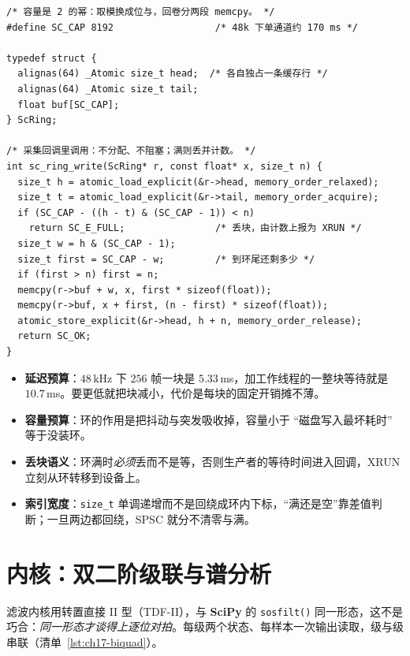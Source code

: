 \documentclass[12pt,a4paper,fontset=fandol]{ctexbook}
\newcommand{\Fn}[1]{\texttt{#1()}}
\newcommand{\Tp}[1]{\texttt{#1}}
\newcommand{\Lib}[1]{\textbf{#1}}
\begin{document}
\begin{lstlisting}[style=cstyle,caption={SPSC 环形缓冲：生产者只写 head，消费者只写 tail},label={lst:ch17-ring}]
/* 容量是 2 的幂：取模换成位与，回卷分两段 memcpy。 */
#define SC_CAP 8192                  /* 48k 下单通道约 170 ms */

typedef struct {
  alignas(64) _Atomic size_t head;  /* 各自独占一条缓存行 */
  alignas(64) _Atomic size_t tail;
  float buf[SC_CAP];
} ScRing;

/* 采集回调里调用：不分配、不阻塞；满则丢并计数。 */
int sc_ring_write(ScRing* r, const float* x, size_t n) {
  size_t h = atomic_load_explicit(&r->head, memory_order_relaxed);
  size_t t = atomic_load_explicit(&r->tail, memory_order_acquire);
  if (SC_CAP - ((h - t) & (SC_CAP - 1)) < n)
    return SC_E_FULL;                /* 丢块，由计数上报为 XRUN */
  size_t w = h & (SC_CAP - 1);
  size_t first = SC_CAP - w;         /* 到环尾还剩多少 */
  if (first > n) first = n;
  memcpy(r->buf + w, x, first * sizeof(float));
  memcpy(r->buf, x + first, (n - first) * sizeof(float));
  atomic_store_explicit(&r->head, h + n, memory_order_release);
  return SC_OK;
}
\end{lstlisting}

\begin{warning}[title={环形缓冲的四笔账}]
\begin{itemize}
\item \textbf{延迟预算}：$48\,\text{kHz}$ 下 $256$ 帧一块是 $5.33$\,ms，加工作线程的一整块等待就是 $10.7$\,ms。要更低就把块减小，代价是每块的固定开销摊不薄。
\item \textbf{容量预算}：环的作用是把抖动与突发吸收掉，容量小于 ``磁盘写入最坏耗时'' 等于没装环。
\item \textbf{丢块语义}：环满时\emph{必须}丢而不是等，否则生产者的等待时间进入回调，XRUN 立刻从环转移到设备上。
\item \textbf{索引宽度}：\Tp{size\_t} 单调递增而不是回绕成环内下标，``满还是空''靠差值判断；一旦两边都回绕，SPSC 就分不清零与满。
\end{itemize}
\end{warning}

\section{内核：双二阶级联与谱分析}

滤波内核用转置直接 II 型（TDF-II），与 \Lib{SciPy} 的 \Fn{sosfilt} 同一形态，这不是巧合：\emph{同一形态才谈得上逐位对拍}。每级两个状态、每样本一次输出读取，级与级串联（清单~\ref{lst:ch17-biquad}）。
\end{document}
